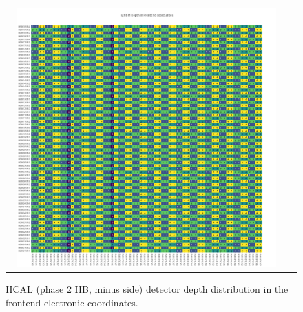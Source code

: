 \clearpage
\begin{figure}[htb]
 \begin{center}
  \begin{tabular}{cc}
   \includegraphics[angle=0,width=0.95\textwidth]{figures/appendix/ngHBM_Depth_in_FrontEnd.png}
  \end{tabular}
  \caption{HCAL (phase 2 HB, minus side) detector depth distribution in the frontend electronic coordinates.}
  \label{fig:lmapngHBMDepthFEC}
 \end{center}
\end{figure}

